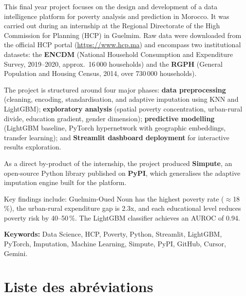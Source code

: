 \documentclass[12pt,a4paper]{report}
\begin{document}
This final year project focuses on the design and development of a data intelligence platform for poverty analysis and prediction in Morocco. It was carried out during an internship at the Regional Directorate of the High Commission for Planning (HCP) in Guelmim. Raw data were downloaded from the official HCP portal (\url{https://www.hcp.ma}) and encompass two institutional datasets: the \textbf{ENCDM} (National Household Consumption and Expenditure Survey, 2019--2020, approx.\ 16\,000 households) and the \textbf{RGPH} (General Population and Housing Census, 2014, over 730\,000 households).

The project is structured around four major phases: \textbf{data preprocessing} (cleaning, encoding, standardisation, and adaptive imputation using KNN and LightGBM); \textbf{exploratory analysis} (spatial poverty concentration, urban-rural divide, education gradient, gender dimension); \textbf{predictive modelling} (LightGBM baseline, PyTorch hypernetwork with geographic embeddings, transfer learning); and \textbf{Streamlit dashboard deployment} for interactive results exploration.

As a direct by-product of the internship, the project produced \textbf{Simpute}, an open-source Python library published on \textbf{PyPI}, which generalises the adaptive imputation engine built for the platform.

Key findings include: Guelmim-Oued Noun has the highest poverty rate ($\approx$18\,\%), the urban-rural expenditure gap is 2.3x, and each educational level reduces poverty risk by 40--50\,\%. The LightGBM classifier achieves an AUROC of 0.94.

\vspace{0.4cm}
\noindent\textbf{Keywords:} Data Science, HCP, Poverty, Python, Streamlit, LightGBM, PyTorch, Imputation, Machine Learning, Simpute, PyPI, GitHub, Cursor, Gemini.

\newpage
\tableofcontents

\newpage
\listoffigures
{}

\newpage
\listoftables
{}

\newpage
\chapter*{Liste des abréviations}
\end{document}
